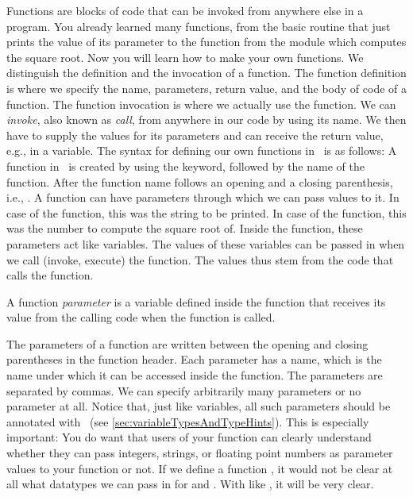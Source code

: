 %
\label{sec:functions}%
%
Functions are blocks of code that can be invoked from anywhere else in a program.
You already learned many functions, from the basic  routine that just prints the value of its parameter to the  function from the  module which computes the square root.
Now you will learn how to make your own functions.%
%
%
\label{sec:definingFunctions}%
%
We distinguish the definition and the invocation of a function.
The function definition is where we specify the name, parameters, return value, and the body of code of a function.
The function invocation is where we actually use the function.
We can \emph{invoke}, also known as \emph{call}, from anywhere in our code by using its name.
We then have to supply the values for its parameters and can receive the return value, e.g., in a variable.
%
The syntax for defining our own functions in \python\ is as follows:%
%
%
%
A function in \python\ is created by using the  keyword, followed by the name of the function.%
%
%
%
After the function name follows an opening and a closing parenthesis, i.e., \pythonIdx{(\idxdots)}.
A function can have parameters through which we can pass values to it.
In case of the  function, this was the string to be printed.
In case of the  function, this was the number to compute the square root of.
Inside the function, these parameters act like variables.
The values of these variables can be passed in when we call (invoke, execute) the function.
The values thus stem from the code that calls the function.%
%
\begin{definition}[Parameter]%
A function \emph{parameter} is a variable defined inside the function that receives its value from the calling code when the function is called.%
\end{definition}%
%
The parameters of a function are written between the opening and closing parentheses in the function header.
Each parameter has a name, which is the name under which it can be accessed inside the function.
The parameters are separated by commas.
We can specify arbitrarily many parameters or no parameter at all.
Notice that, just like variables, all such parameters should be annotated with ~(see \cref{sec:variableTypesAndTypeHints}).
This is especially important:
You do want that users of your function can clearly understand whether they can pass integers, strings, or floating point numbers as parameter values to your function or not.
If we define a function , it would not be clear at all what datatypes we can pass in for  and .
With  like , it will be very clear.

